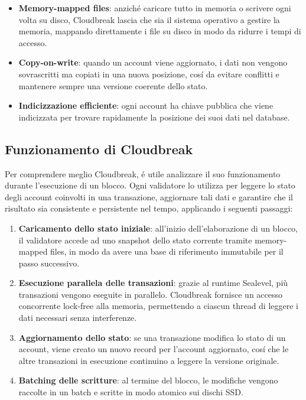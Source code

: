 \documentclass[a4paper,12pt]{report}
\begin{document}
	\begin{itemize}
		\item \textbf{Memory-mapped files}: anziché caricare tutto in memoria o scrivere ogni volta su disco, Cloudbreak lascia che sia il sistema operativo a gestire la memoria, mappando direttamente i file su disco in modo da ridurre i tempi di accesso.
		\item \textbf{Copy-on-write}: quando un account viene aggiornato, i dati non vengono sovrascritti ma copiati in una nuova posizione, cosí da evitare conflitti e mantenere sempre una versione coerente dello stato.
		\item \textbf{Indicizzazione efficiente}: ogni account ha chiave pubblica che viene indicizzata per trovare rapidamente la posizione dei suoi dati nel database.
	\end{itemize}
	
	\subsection{Funzionamento di Cloudbreak}
	Per comprendere meglio Cloudbreak, é utile analizzare il suo funzionamento durante l'esecuzione di un blocco. Ogni validatore lo utilizza per leggere lo stato degli account coinvolti in una transazione, aggiornare tali dati e garantire che il risultato sia consistente e persistente nel tempo, applicando i seguenti passaggi:
	\begin{enumerate}
		\item \textbf{Caricamento dello stato iniziale}: all'inizio dell'elaborazione di un blocco, il validatore accede ad uno snapshot dello stato corrente tramite memory-mapped files, in modo da avere una base di riferimento immutabile per il passo successivo.
		\item \textbf{Esecuzione parallela delle transazioni}: grazie al runtime Sealevel, più transazioni vengono eseguite in parallelo. Cloudbreak fornisce un accesso concorrente lock-free alla memoria, permettendo a ciascun thread di leggere i dati necessari senza interferenze.
		\item \textbf{Aggiornamento dello stato}: se una transazione modifica lo stato di un account, viene creato un nuovo record per l'account aggiornato, cosí che le altre transazioni in esecuzione continuino a leggere la versione originale.
		\item \textbf{Batching delle scritture}: al termine del blocco, le modifiche vengono raccolte in un batch e scritte in modo atomico sui dischi SSD.
	\end{enumerate}
	
\end{document}
